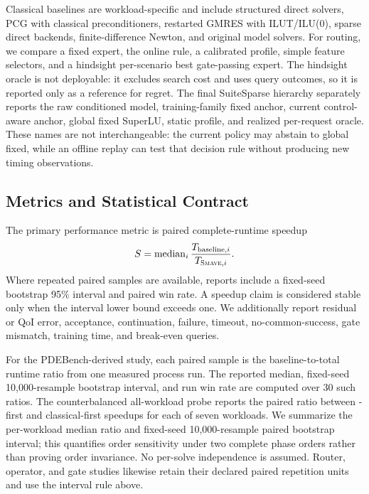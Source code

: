 Classical baselines are workload-specific and include structured direct solvers,
PCG with classical preconditioners, restarted GMRES with ILUT/ILU(0), sparse direct
backends, finite-difference Newton, and original model solvers. For routing, we
compare a fixed expert, the online rule, a calibrated profile, simple feature
selectors, and a hindsight per-scenario best gate-passing expert. The hindsight oracle is
not deployable: it excludes search cost and uses query outcomes, so it is reported
only as a reference for regret. The final SuiteSparse hierarchy separately reports
the raw conditioned model, training-family fixed anchor, current control-aware anchor,
global fixed SuperLU, static profile, and realized per-request oracle. These names are
not interchangeable: the current policy may abstain to global fixed, while an offline
replay can test that decision rule without producing new timing observations.

\subsection{Metrics and Statistical Contract}

The primary performance metric is paired complete-runtime speedup
\begin{equation}
 S=\operatorname{median}_i \frac{T_{\mathrm{baseline},i}}
 {T_{\textsc{Smave},i}}.
\end{equation}
Where repeated paired samples are available, reports include a fixed-seed
bootstrap 95\% interval and paired win rate. A speedup claim is considered stable
only when the interval lower bound exceeds one. We additionally report residual or
QoI error, acceptance, continuation, failure, timeout, no-common-success, gate mismatch,
training time, and break-even queries.

For the PDEBench-derived study, each paired sample is the baseline-to-\system total
runtime ratio from one measured process run. The reported median, fixed-seed
10,000-resample bootstrap interval, and run win rate are computed over 30 such
ratios. The counterbalanced all-workload probe reports the paired ratio between
\system-first and classical-first speedups for each of seven workloads. We summarize
the per-workload median ratio and fixed-seed 10,000-resample paired bootstrap
interval; this quantifies order sensitivity under two complete phase orders rather
than proving order invariance. No per-solve independence is assumed. Router,
operator, and gate studies likewise retain their declared paired repetition units
and use the interval rule above.

